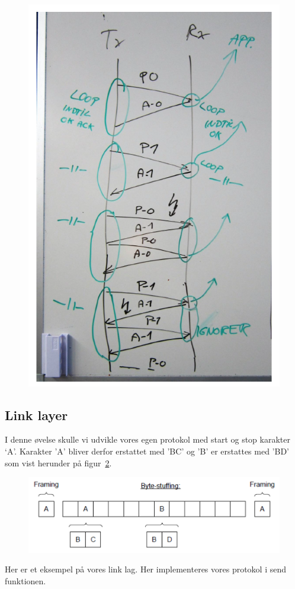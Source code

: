 \begin{figure}[h]
	\centering
	\includegraphics[width=0.7\linewidth]{figs/sekvensdia}
	\caption{}
	\label{fig:sekvensdia}
\end{figure}

\subsection{Link layer}
I denne øvelse skulle vi udvikle vores egen protokol med start og stop karakter ‘A’. Karakter ’A’ bliver derfor
erstattet med ’BC’ og ’B’ er erstattes med ’BD’ som vist herunder på figur~\ref{fig:bd}.

\begin{figure}[h]
	\centering
	\includegraphics[width=0.7\linewidth]{figs/bd}
	\caption{}
	\label{fig:bd}
\end{figure}

Her er et eksempel på vores link lag. Her implementeres vores protokol i send funktionen.

